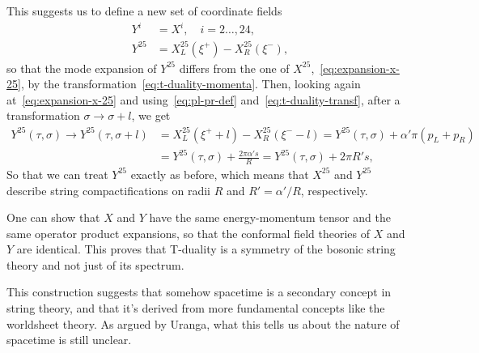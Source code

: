 This suggests us to define a new set of coordinate fields
\begin{equation}
\begin{aligned}
    Y^i &= X^i, \quad i = 2 \dots, 24, \\
    Y^{25} &= X^{25}_L(\xi^+) - X^{25}_R(\xi^-) ,
\end{aligned}
\end{equation}
so that the mode expansion of $Y^{25}$ differs from the one of $X^{25}$,~\eqref{eq:expansion-x-25}, by the transformation~\eqref{eq:t-duality-momenta}. Then, looking again at~\eqref{eq:expansion-x-25} and using~\eqref{eq:pl-pr-def} and~\eqref{eq:t-duality-transf}, after a transformation $\sigma \to \sigma + l$, we get
\begin{equation}
\begin{aligned}
    Y^{25}(\tau, \sigma) \to Y^{25}(\tau, \sigma + l) &= X^{25}_L (\xi^+ + l) - X^{25}_R(\xi^- - l) = Y^{25}(\tau,\sigma) + \alpha' \pi (p_L + p_R) \\
    &= Y^{25}(\tau,\sigma) + \frac{2\pi\alpha' s}{R} = Y^{25}(\tau,\sigma) + 2\pi R' s ,
\end{aligned}
\end{equation}
So that we can treat $Y^{25}$ exactly as before, which means that $X^{25}$ and $Y^{25}$ describe string compactifications on radii $R$ and $R' = \alpha'/R$, respectively.

One can show that $X$ and $Y$ have the same energy-momentum tensor and the same operator product expansions, so that the conformal field theories of $X$ and $Y$ are identical. This proves that T-duality is a symmetry of the bosonic string theory and not just of its spectrum.

This construction suggests that somehow spacetime is a secondary concept in string theory, and that it's derived from more fundamental concepts like the worldsheet theory. As argued by Uranga, what this tells us about the nature of spacetime is still unclear.